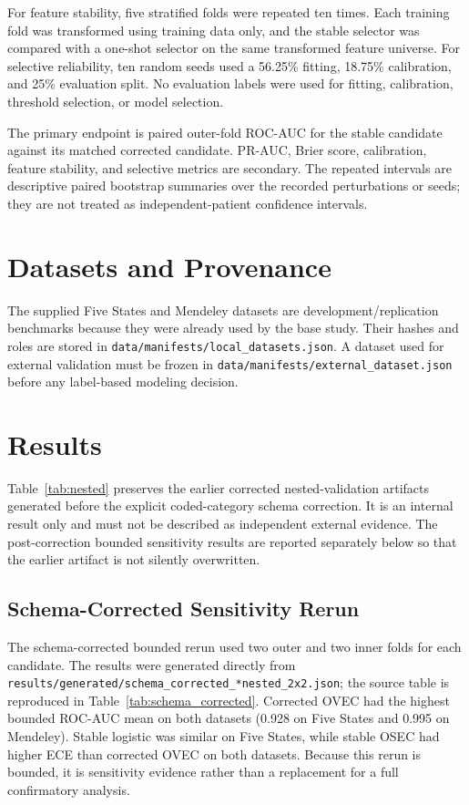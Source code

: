 \documentclass[journal]{IEEEtran}
\begin{document}
For feature stability, five stratified folds were repeated ten times. Each
training fold was transformed using training data only, and the stable selector
was compared with a one-shot selector on the same transformed feature universe.
For selective reliability, ten random seeds used a 56.25\% fitting, 18.75\%
calibration, and 25\% evaluation split. No evaluation labels were used for
fitting, calibration, threshold selection, or model selection.

The primary endpoint is paired outer-fold ROC-AUC for the stable candidate
against its matched corrected candidate. PR-AUC, Brier score, calibration,
feature stability, and selective metrics are secondary. The repeated intervals
are descriptive paired bootstrap summaries over the recorded perturbations or
seeds; they are not treated as independent-patient confidence intervals.

\section{Datasets and Provenance}
The supplied Five States and Mendeley datasets are development/replication
benchmarks because they were already used by the base study. Their hashes and
roles are stored in \texttt{data/manifests/local\_datasets.json}. A dataset
used for external validation must be frozen in
\texttt{data/manifests/external\_dataset.json} before any label-based modeling
decision.

\section{Results}
Table~\ref{tab:nested} preserves the earlier corrected nested-validation
artifacts generated before the explicit coded-category schema correction. It is
an internal result only and must not be described as independent external
evidence. The post-correction bounded sensitivity results are reported
separately below so that the earlier artifact is not silently overwritten.

\begin{table}[t]
\centering
\caption{Nested internal validation summary.}
\label{tab:nested}

\end{table}

\subsection{Schema-Corrected Sensitivity Rerun}
The schema-corrected bounded rerun used two outer and two inner folds for each
candidate. The results were generated directly from
\texttt{results/generated/schema\_corrected\_*nested\_2x2.json}; the source
table is reproduced in Table~\ref{tab:schema_corrected}. Corrected OVEC had the
highest bounded ROC-AUC mean on both datasets (0.928 on Five States and 0.995 on
Mendeley). Stable logistic was similar on Five States, while stable OSEC had
higher ECE than corrected OVEC on both datasets. Because this rerun is bounded,
it is sensitivity evidence rather than a replacement for a full confirmatory
analysis.
\end{document}
